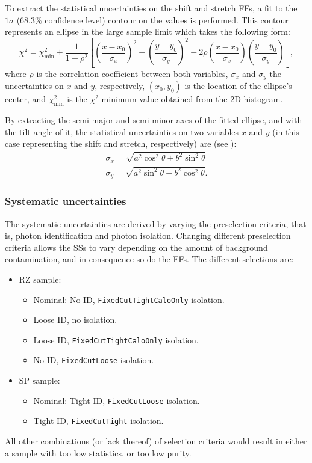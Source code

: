 To extract the statistical uncertainties on the shift and stretch \acp{FF}, a fit to the \(1\sigma\) (\(68.3\%\) confidence level) contour on the \chisq values is performed. This contour represents an ellipse in the large sample limit which takes the following form:
\begin{equation}
    \chi^2 = \chi^2_{\text{min}} + \frac{1}{1-\rho^2} \left[ \left( \frac{x-x_0}{\sigma_x} \right)^2 + \left( \frac{y-y_0}{\sigma_y} \right)^2 - 2\rho \left( \frac{x-x_0}{\sigma_x} \right) \left( \frac{y-y_0}{\sigma_y} \right) \right],
\end{equation}
where \(\rho\) is the correlation coefficient between both variables, \(\sigma_x\) and \(\sigma_y\) the uncertainties on \(x\) and \(y\), respectively, \((x_0, y_0)\) is the location of the ellipse's center, and \(\chi^2_{\text{min}}\) is the \(\chi^2\) minimum value obtained from the 2D histogram.


By extracting the semi-major and semi-minor axes of the fitted ellipse, and with the tilt angle of it, the statistical uncertainties on two variables \(x\) and \(y\) (in this case representing the shift and stretch, respectively) are (see \App{\ref{app:ellipse_formulae}}):
\begin{gather}
    \sigma_x = \sqrt{a^2 \cos^2\theta + b^2 \sin^2\theta}\\
    \sigma_y = \sqrt{a^2 \sin^2\theta + b^2 \cos^2\theta}.
\end{gather}

\subsubsection{Systematic uncertainties}

The systematic uncertainties are derived by varying the preselection criteria, that is, photon identification and photon isolation. Changing different preselection criteria allows the \acp{SS} to vary depending on the amount of background contamination, and in consequence so do the \acp{FF}.
The different selections are:
\begin{itemize}
    \item \acf{RZ} sample:
        \begin{itemize}
            \item Nominal: No ID, \texttt{FixedCutTightCaloOnly} isolation.
            \item Loose ID, no isolation.
            \item Loose ID, \texttt{FixedCutTightCaloOnly} isolation.
            \item No ID, \texttt{FixedCutLoose} isolation.
        \end{itemize}
    \item \acf{SP} sample:
        \begin{itemize}
            \item Nominal: Tight ID, \texttt{FixedCutLoose} isolation.
            \item Tight ID, \texttt{FixedCutTight} isolation.
        \end{itemize}
\end{itemize}
All other combinations (or lack thereof) of selection criteria would result in either a sample with too low statistics, or too low purity.

